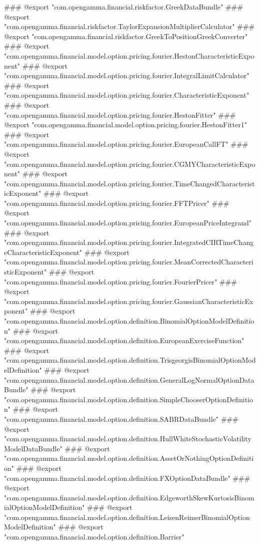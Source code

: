 ### @export "com.opengamma.financial.riskfactor.GreekDataBundle"
### @export "com.opengamma.financial.riskfactor.TaylorExpansionMultiplierCalculator"
### @export "com.opengamma.financial.riskfactor.GreekToPositionGreekConverter"
### @export "com.opengamma.financial.model.option.pricing.fourier.HestonCharacteristicExponent"
### @export "com.opengamma.financial.model.option.pricing.fourier.IntegralLimitCalculator"
### @export "com.opengamma.financial.model.option.pricing.fourier.CharacteristicExponent"
### @export "com.opengamma.financial.model.option.pricing.fourier.HestonFitter"
### @export "com.opengamma.financial.model.option.pricing.fourier.HestonFitter1"
### @export "com.opengamma.financial.model.option.pricing.fourier.EuropeanCallFT"
### @export "com.opengamma.financial.model.option.pricing.fourier.CGMYCharacteristicExponent"
### @export "com.opengamma.financial.model.option.pricing.fourier.TimeChangedCharacteristicExponent"
### @export "com.opengamma.financial.model.option.pricing.fourier.FFTPricer"
### @export "com.opengamma.financial.model.option.pricing.fourier.EuropeanPriceIntegrand"
### @export "com.opengamma.financial.model.option.pricing.fourier.IntegratedCIRTimeChangeCharacteristicExponent"
### @export "com.opengamma.financial.model.option.pricing.fourier.MeanCorrectedCharacteristicExponent"
### @export "com.opengamma.financial.model.option.pricing.fourier.FourierPricer"
### @export "com.opengamma.financial.model.option.pricing.fourier.GaussianCharacteristicExponent"
### @export "com.opengamma.financial.model.option.definition.BinomialOptionModelDefinition"
### @export "com.opengamma.financial.model.option.definition.EuropeanExerciseFunction"
### @export "com.opengamma.financial.model.option.definition.TrisgeorgisBinomialOptionModelDefinition"
### @export "com.opengamma.financial.model.option.definition.GeneralLogNormalOptionDataBundle"
### @export "com.opengamma.financial.model.option.definition.SimpleChooserOptionDefinition"
### @export "com.opengamma.financial.model.option.definition.SABRDataBundle"
### @export "com.opengamma.financial.model.option.definition.HullWhiteStochasticVolatilityModelDataBundle"
### @export "com.opengamma.financial.model.option.definition.AssetOrNothingOptionDefinition"
### @export "com.opengamma.financial.model.option.definition.FXOptionDataBundle"
### @export "com.opengamma.financial.model.option.definition.EdgeworthSkewKurtosisBinomialOptionModelDefinition"
### @export "com.opengamma.financial.model.option.definition.LeisenReimerBinomialOptionModelDefinition"
### @export "com.opengamma.financial.model.option.definition.Barrier"
